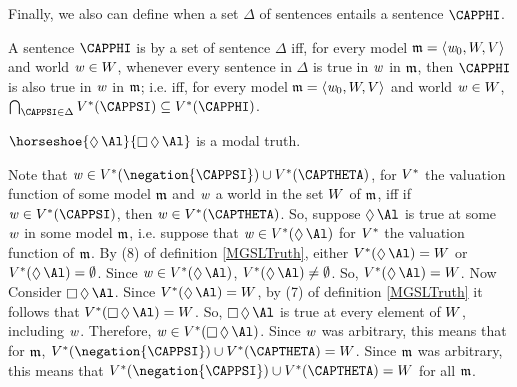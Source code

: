 Finally, we also can define when a set $\Delta$ of \MGSL{} sentences entails a sentence $\CAPPHI$.
\begin{majorILnc}{}
A sentence $\CAPPHI$ is  by a set of sentence $\Delta$ iff, for every model $\mathfrak{m}=\langle\mathit{w}_0,W,V\rangle$ and world $\mathit{w}\in W$, whenever every sentence in $\Delta$ is true in $\mathit{w}$ in $\mathfrak{m}$, then $\CAPPHI$ is also true in $\mathit{w}$ in $\mathfrak{m}$; i.e. iff, for every model $\mathfrak{m}=\langle\mathit{w}_0,W,V\rangle$ and world $\mathit{w}\in W$,  $\bigcap_{\CAPPSI\in\Delta}\integer{V}^*(\CAPPSI)\subseteq\integer{V}^*(\CAPPHI)$.
\end{majorILnc}

\begin{majorILnc}{}
$\horseshoe{\DIAMOND\Al}{\BOX\DIAMOND\Al}$ is a modal truth. 
\end{majorILnc}
\begin{PROOF}
Note that $\world{w}\in\integer{V}^*(\negation{\CAPPSI})\cup\integer{V}^*(\CAPTHETA)$, for $V^*$ the valuation function of some model $\mathfrak{m}$ and $\mathit{w}$ a world in the set $W$ of $\mathfrak{m}$, iff if $\world{w}\in\integer{V}^*(\CAPPSI)$, then $\world{w}\in\integer{V}^*(\CAPTHETA)$. 
So, suppose $\DIAMOND\Al$ is true at some $\mathit{w}$ in some model $\mathfrak{m}$, i.e. suppose that $\world{w}\in\integer{V}^*(\DIAMOND\Al)$ for $V^*$ the valuation function of $\mathfrak{m}$. 
By (8) of definition \ref{MGSLTruth}, either $\integer{V}^*(\DIAMOND\Al)=\integer{W}$ or $\integer{V}^*(\DIAMOND\Al)=\emptyset$. 
Since $\world{w}\in\integer{V}^*(\DIAMOND\Al)$, $\integer{V}^*(\DIAMOND\Al)\neq\emptyset$. 
So, $\integer{V}^*(\DIAMOND\Al)=\integer{W}$. 
Now Consider $\BOX\DIAMOND\Al$. 
Since $\integer{V}^*(\DIAMOND\Al)=\integer{W}$, by (7) of definition \ref{MGSLTruth} it follows that $\integer{V}^*(\BOX\DIAMOND\Al)=\integer{W}$. 
So, $\BOX\DIAMOND\Al$ is true at every element of $W$, including $\mathit{w}$. 
Therefore, $\world{w}\in\integer{V}^*(\BOX\DIAMOND\Al)$. 
Since $\mathit{w}$ was arbitrary, this means that for $\mathfrak{m}$, $\integer{V}^*(\negation{\CAPPSI})\cup\integer{V}^*(\CAPTHETA)=\integer{W}$. 
Since $\mathfrak{m}$ was arbitrary, this means that $\integer{V}^*(\negation{\CAPPSI})\cup\integer{V}^*(\CAPTHETA)=\integer{W}$ for all $\mathfrak{m}$.
\end{PROOF}

